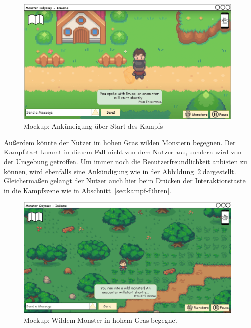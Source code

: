 \begin{figure}[H]
    \center
    \includegraphics[scale=\scale]{images/mockups/Ingame/PlayerAndPlayerFight.png}
    \caption{Mockup: Ankündigung über Start des Kampfs}
    \label{fig: Ankündigung über Start des Kampfs}
\end{figure}
Außerdem könnte der Nutzer im hohen Gras wilden Monstern begegnen.
Der Kampfstart kommt in diesem Fall nicht von dem Nutzer aus, sondern wird von der Umgebung getroffen.
Um immer noch die Benutzerfreundlichkeit anbieten zu können, wird ebenfalls eine Ankündigung wie in der Abbildung~\ref{fig: Wildem Monster in hohem Gras begegnet} dargestellt.
Gleichermaßen gelangt der Nutzer auch hier beim Drücken der Interaktionstaste in die Kampfszene wie in Abschnitt~\ref{sec:kampf-führen}.
\begin{figure}[H]
    \center
    \includegraphics[scale=\scale]{images/mockups/Ingame/PlayerAndWildMonsterFight.png}
    \caption{Mockup: Wildem Monster in hohem Gras begegnet}
    \label{fig: Wildem Monster in hohem Gras begegnet}
\end{figure}
